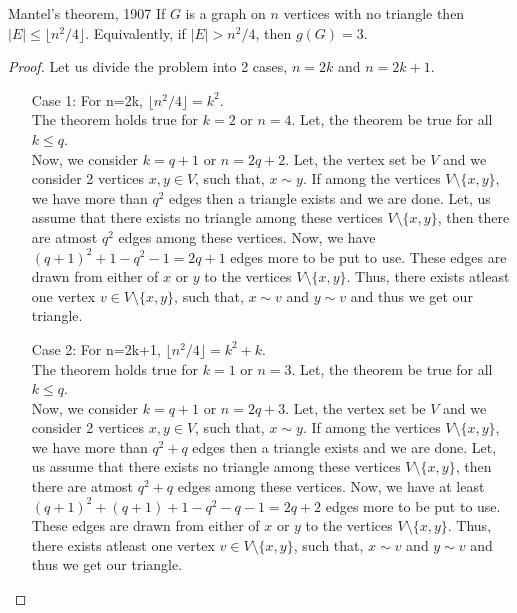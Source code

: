 \documentclass[../basic_graph_theory.tex]{subfiles}
\begin{document}
\begin{Thm}{Mantel's theorem, 1907}{}
    If $G$ is a graph on $n$ vertices with no triangle then $|E| \leq \lfloor n^2/4 \rfloor $. Equivalently, if $|E| > n^2/4$, then $g(G) = 3$.
\end{Thm}
\begin{proof}
    Let us divide the problem into 2 cases, $n=2k$ and $n=2k+1$. 
    \begin{enumerate}
        \item[Case 1:] For n=2k, $\lfloor n^2/4 \rfloor = k^2$.\\
        The theorem holds true for $k=2$ or $n=4$. Let, the theorem be true for all $k \le q$.\\
        Now, we consider $k=q+1$ or $n=2q+2$. Let, the vertex set be $V$ and we consider 2 vertices $x,y \in V$, such that, $x \sim y$. If among the vertices $V\setminus\{x,y\}$, we have more than $q^2$ edges then a triangle exists and we are done. Let, us assume that there exists no triangle among these vertices $V\setminus\{x,y\}$, then there are atmost $q^2$ edges among these vertices. Now, we have $(q+1)^2+1-q^2-1=2q+1$ edges more to be put to use. These edges are drawn from either of $x$ or $y$ to the vertices $V\setminus\{x,y\}$. Thus, there exists atleast one vertex $v \in V\setminus\{x,y\}$, such that, $x \sim v$ and $y \sim v$ and thus we get our triangle.
        \item[Case 2:] For n=2k+1, $\lfloor n^2/4 \rfloor = k^2+k$.\\
        The theorem holds true for $k=1$ or $n=3$. Let, the theorem be true for all $k \le q$.\\
        Now, we consider $k=q+1$ or $n=2q+3$. Let, the vertex set be $V$ and we consider 2 vertices $x,y \in V$, such that, $x \sim y$. If among the vertices $V\setminus\{x,y\}$, we have more than $q^2+q$ edges then a triangle exists and we are done. Let, us assume that there exists no triangle among these vertices $V\setminus\{x,y\}$, then there are atmost $q^2+q$ edges among these vertices. Now, we have at least $(q+1)^2+(q+1)+1-q^2-q-1=2q+2$ edges more to be put to use. These edges are drawn from either of $x$ or $y$ to the vertices $V\setminus\{x,y\}$. Thus, there exists atleast one vertex $v \in V\setminus\{x,y\}$, such that, $x \sim v$ and $y \sim v$ and thus we get our triangle.
    \end{enumerate}
\end{proof}
\end{document}
